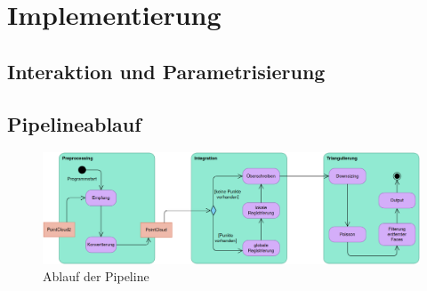 
\chapter{Implementierung}
\label{ch:implementierung}


\section{Interaktion und Parametrisierung}
\label{sec:interaktion}


\section{Pipelineablauf}
\label{sec:pipeline}

\begin{figure}[ht]
	\centering
	\includegraphics[width=\textwidth]{images/pipeline.png}
	\caption{Ablauf der Pipeline}
	\label{fig:pipeline}
\end{figure}

